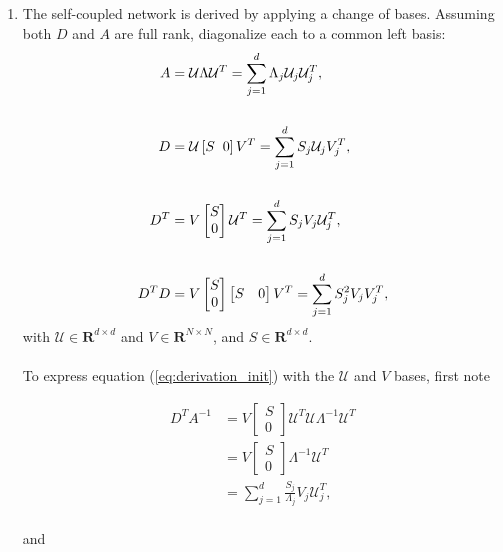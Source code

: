 \begin{enumerate}
\clearpage

\item The self-coupled network is derived by applying a change of bases.  
Assuming both $D$ and $A$ are full rank, diagonalize each to a common left basis:
\begin{align*}
    A &= \mathcal{U} \Lambda \mathcal{U}^T = \sum_{j=1}^d \Lambda_j \mathcal{U}_j \mathcal{U}_j^T,\\
    \\
    D &= \mathcal{U} \left[S \hspace{2mm} 0 \right]  V^T = \sum_{j=1}^d S_j \mathcal{U}_j  V_j^T,\\
    \\
    D^T &= V \begin{bmatrix} S \\ 0\end{bmatrix} \mathcal{U}^T = \sum_{j=1}^d S_j V_j  \mathcal{U}_j^T, \\
    \\
    D^T D  &= V \begin{bmatrix} S \\ 0\end{bmatrix} \begin{bmatrix} S & 0\end{bmatrix} V^T
     = \sum_{j=1}^d S_j^2 V_j V_j^T , 
\end{align*}
with $\mathcal{U} \in \mathbf{R}^{d \times d}$ and $V \in \mathbf{R}^{N \times N}$, and $S \in \mathbf{R}^{d \times d }$. \\
\\
To express equation (\ref{eq:derivation_init}) with the $\mathcal{U}$ and $V$ bases, first note

\begin{align*}
     D^{T} A^{-1}  &= V \begin{bmatrix} S \\ 0\end{bmatrix} \mathcal{U}^T  \mathcal{U} \Lambda^{-1} \mathcal{U}^T \\
     &= V \begin{bmatrix} S \\ 0\end{bmatrix} \Lambda^{-1} \mathcal{U}^T \\
     &= \sum_{j = 1}^{d} \frac{S_j}{ \Lambda_j} V_j \mathcal{U}_j^T,
\end{align*}\\

and


\end{enumerate}

